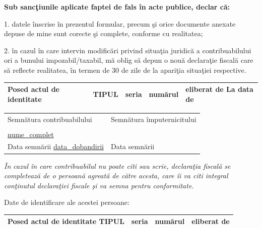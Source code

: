 \documentclass[8pt,a4paper,landscape]{extarticle}
\newcommand{\fillline}[1][6cm]{\underline{\hspace{#1}}}
\begin{document}
\vspace{0.15cm}

\textbf{Sub sancţiunile aplicate faptei de fals în acte publice, declar că:}

1. datele înscrise în prezentul formular, precum şi orice documente anexate depuse de mine sunt corecte şi complete, conforme cu realitatea;

2. în cazul în care intervin modificări privind situaţia juridică a contribuabilului ori a bunului impozabil/taxabil, mă oblig să depun o nouă declaraţie fiscală care să reflecte realitatea, în termen de 30 de zile de la apariţia situaţiei respective.

\vspace{0.15cm}

\begin{tabularx}{\textwidth}{|X|X|X|X|X|}
\hline
Posed actul de identitate & TIPUL \fillline[2cm] & seria \fillline[2cm] & numărul \fillline[3cm] & eliberat de \fillline[3cm] \quad La data de \fillline[2.5cm] \\
\hline
\end{tabularx}

\vspace{0.5cm}

\begin{tabularx}{\textwidth}{|X|X|}
\hline
Semnătura contribuabilului & Semnătura împuternicitului \\
& \\
\underline{ {{nume_complet}} } & \fillline[7cm] \\
Data semnării \underline{ {{data_dobandirii}} } & Data semnării \fillline[4cm] \\
\hline
\end{tabularx}

\vspace{0.5cm}

\footnotesize\textit{În cazul în care contribuabilul nu poate citi sau scrie, declaraţia fiscală se completează de o persoană agreată de către acesta, care îi va citi integral conţinutul declaraţiei fiscale şi va semna pentru conformitate.}\normalsize

\vspace{0.15cm}

Date de identificare ale acestei persoane:

\begin{tabularx}{\textwidth}{|X|X|X|X|}
\hline
Posed actul de identitate TIPUL \fillline[2cm] & seria \fillline[2cm] & numărul \fillline[3cm] & eliberat de \fillline[3cm] \\
\hline
\end{tabularx}
\end{document}
